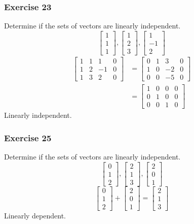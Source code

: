 \documentclass{math}
\begin{document}
\subsubsection*{Exercise 23}
Determine if the sets of vectors are linearly independent.
\[ \begin{bmatrix}1 \\ 1 \\ 1\end{bmatrix},
  \begin{bmatrix}1 \\ 2 \\ 3\end{bmatrix},
  \begin{bmatrix}1 \\ -1 \\ 2\end{bmatrix} \]
\begin{align*}
  \begin{bmatrix}
    1 & 1 & 1 & 0 \\
    1 & 2 & -1 & 0 \\
    1 & 3 & 2 & 0
  \end{bmatrix} &= \begin{bmatrix}
    0 & 1 & 3 & 0 \\
    1 & 0 & -2 & 0 \\
    0 & 0 & -5 & 0
  \end{bmatrix} \\
  &= \begin{bmatrix}
    1 & 0 & 0 & 0 \\
    0 & 1 & 0 & 0 \\
    0 & 0 & 1 & 0
  \end{bmatrix}
\end{align*}
Linearly independent.

\subsubsection*{Exercise 25}
Determine if the sets of vectors are linearly independent.
\[ \begin{bmatrix}0 \\ 1 \\ 2\end{bmatrix},
  \begin{bmatrix}2 \\ 1 \\ 3\end{bmatrix},
  \begin{bmatrix}2 \\ 0 \\ 1\end{bmatrix} \]
\[ \begin{bmatrix}0 \\ 1 \\ 2\end{bmatrix}+
  \begin{bmatrix}2 \\ 0 \\ 1\end{bmatrix} =
  \begin{bmatrix}2 \\ 1 \\ 3\end{bmatrix} \]
Linearly dependent.
\end{document}
